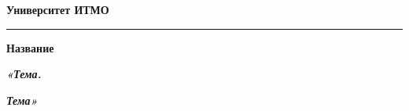 \documentclass[12pt]{article}
\begin{document}
\pagestyle{empty}
\begin{center}
\large{\textbf{Университет ИТМО}}
\end{center}
\rule{500pt}{1pt}
\par\bigskip\par\bigskip\par\bigskip\par\bigskip\par\bigskip\par\bigskip\par\bigskip\par\bigskip\par\bigskip\par\bigskip\par\bigskip\par\bigskip\par\bigskip\par\bigskip\par\bigskip\par\bigskip\par\bigskip
\par\bigskip\par\bigskip\par\bigskip\par\bigskip\par\bigskip\par\bigskip
\begin{center}
\Large
\textbf{Название}

\textbf{\textit{«Тема.}}

\textbf{\textit{Тема»}}
\end{center}
\par\bigskip\par\bigskip\par\bigskip\par\bigskip\par\bigskip\par\bigskip\par\bigskip\par\bigskip\par\bigskip\par\bigskip\par\bigskip\par\bigskip\par\bigskip\par\bigskip\par\bigskip    
\end{document}
